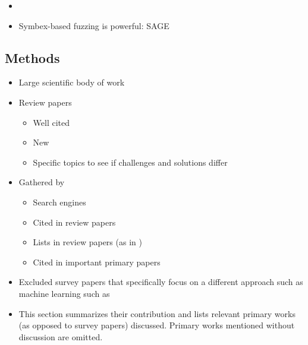 \documentclass{article}
\begin{document}
\begin{itemize}
\begin{itemize}
          \item {}\cite{EvaluatingFuzzTesting}
        \end{itemize}
  \item {}\cite{AllYouEverWanted}
  \item Symbex-based fuzzing is powerful: SAGE\cite{SAGE} \cite{FuzzingTheStateOfTheArt}
\end{itemize}

\subsection{Methods}
\begin{itemize}
  \item Large scientific body of work
  \item Review papers
        \begin{itemize}
          \item Well cited
          \item New
          \item Specific topics to see if challenges and solutions differ
        \end{itemize}
  \item Gathered by
        \begin{itemize}
          \item Search engines
          \item Cited in review papers
          \item Lists in review papers (as in \cite{Demystifying})
          \item Cited in important primary papers
        \end{itemize}
  \item Excluded survey papers that specifically focus on a different approach such as machine learning such as \cite{ML1, ML2}
  \item This section summarizes their contribution and lists relevant primary works (as opposed to survey papers) discussed. Primary works mentioned without discussion are omitted.
\end{itemize}
\end{document}
